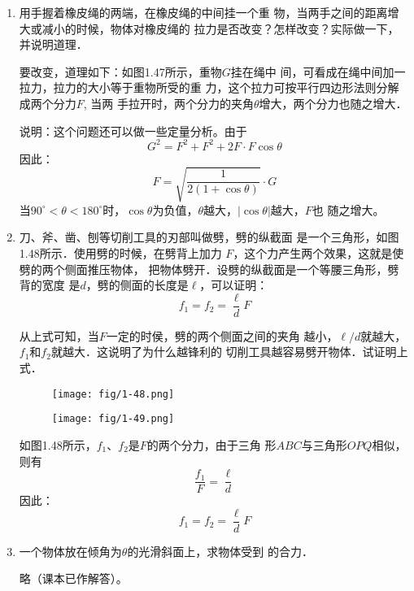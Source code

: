 \begin{enumerate}
\item   用手握着橡皮绳的两端，在橡皮绳的中间挂一个重
物，当两手之间的距离增大或减小的时候，物体对橡皮绳的
拉力是否改变？怎样改变？实际做一下，并说明道理．


\begin{solution}
    要改变，道理如下：如图1.47所示，重物$G$挂在绳中
    间，可看成在绳中间加一拉力，拉力的大小等于重物所受的重
    力，这个拉力可按平行四边形法则分解成两个分力$F$, 当两
    手拉开时，两个分力的夹角$\theta$增大，两个分力也随之增大．

    说明：这个问题还可以做一些定量分析。由于
    \[G^2=F^2+F^2+2F\cdot F\cos\theta\]
    因此：
    \[F=\sqrt{\frac{1}{2(1+\cos\theta)}}\cdot G\]
    当$90^{\circ}<\theta<180^{\circ}$时，$\cos\theta$为负值，$\theta$越大，$|\cos\theta|$越大，$F$也
    随之增大。
\end{solution}
\item  刀、斧、凿、刨等切削工具的刃部叫做劈，劈的纵截面
是一个三角形，如图1.48所示．使用劈的时候，在劈背上加力
$F$，这个力产生两个效果，这就是使劈的两个侧面推压物体，
把物体劈开．设劈的纵截面是一个等腰三角形，劈背的宽度
是$d$，劈的侧面的长度是$\ell$，可以证明：
\[f_1=f_2=\frac{\ell}{d}F \]

从上式可知，当$F$一定的时侯，劈的两个侧面之间的夹角
越小，$\ell/d$就越大，$f_1$和$f_2$就越大．这说明了为什么越锋利的
切削工具越容易劈开物体．试证明上式．
\begin{figure}[htp]\centering
    \begin{minipage}[t]{0.48\textwidth}
    \centering
\texttt{[image: fig/1-48.png]}
    \caption{}
    \end{minipage}
    \begin{minipage}[t]{0.48\textwidth}
    \centering
    \texttt{[image: fig/1-49.png]}
    \caption{}
    \end{minipage}
    \end{figure}


\begin{solution}
    如图1.48所示，$f_1$、$f_2$是$F$的两个分力，由于三角
    形$ABC$与三角形$OPQ$相似，则有
\[\frac{f_1}{F}=\frac{\ell}{d}\]
因此：\[f_1=f_2=\frac{\ell}{d}F\]
\end{solution}


\item 一个物体放在倾角为$\theta$的光滑斜面上，求物体受到
的合力．

\begin{solution}
    略（课本已作解答）。
\end{solution}
   


\end{enumerate}
